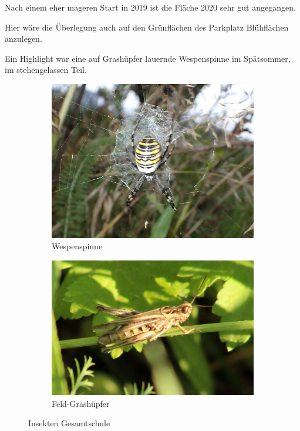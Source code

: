 \documentclass[11pt]{article}
\begin{document}
Nach einem eher mageren Start in 2019 ist die Fläche 2020 sehr gut angegangen.

Hier wäre die Überlegung auch auf den Grünflächen des Parkplatz Blühflächen anzulegen.

Ein Highlight war eine auf Grashüpfer lauernde Wespenspinne im Spätsommer, im stehengelassen Teil.


\begin{figure}[h!]
  \centering
  \begin{subfigure}[b]{0.34\linewidth}
    \includegraphics[width=\linewidth]{img/gesamtschule/wespenspinne.jpg}
    \caption{Wespenspinne}
  \end{subfigure}
  \begin{subfigure}[b]{0.38\linewidth}
    \includegraphics[width=\linewidth]{img/gesamtschule/grashuepfer.jpg}
    \caption{Feld-Grashüpfer}
  \end{subfigure}
  \caption{Insekten Gesamtschule}
\end{figure}
\end{document}
